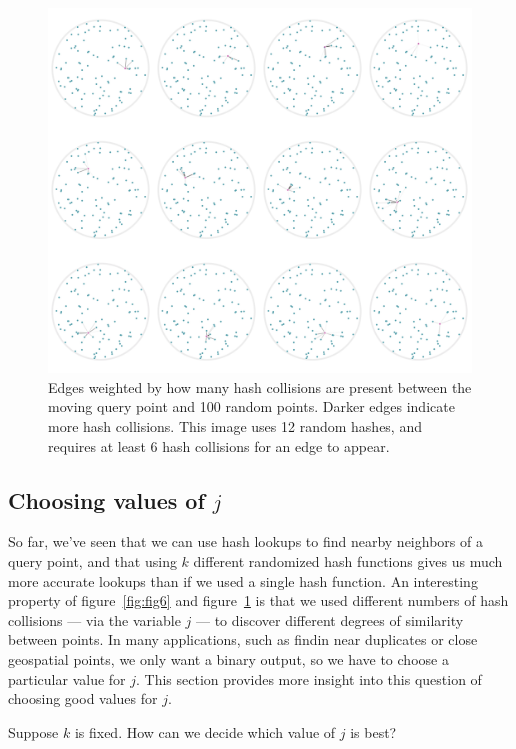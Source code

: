 \documentclass[20pt,]{extarticle}
\begin{document}
\begin{figure}
\centering
\includegraphics{images/image8b_fixed.png}
\caption{Edges weighted by how many hash collisions are present between
the moving query point and 100 random points. Darker edges indicate more
hash collisions. This image uses 12 random hashes, and requires at least
6 hash collisions for an edge to appear.}\label{fig:fig8b}
\end{figure}

\subsection{\texorpdfstring{Choosing values of
\(j\)}{Choosing values of j}}\label{choosing-values-of-j}

So far, we've seen that we can use hash lookups to find nearby neighbors
of a query point, and that using \(k\) different randomized hash
functions gives us much more accurate lookups than if we used a single
hash function. An interesting property of figure~\ref{fig:fig6} and
figure~\ref{fig:fig8b} is that we used different numbers of hash
collisions --- via the variable \(j\) --- to discover different degrees
of similarity between points. In many applications, such as findin near
duplicates or close geospatial points, we only want a binary output, so
we have to choose a particular value for \(j\). This section provides
more insight into this question of choosing good values for \(j\).

Suppose \(k\) is fixed. How can we decide which value of \(j\) is best?
\end{document}
